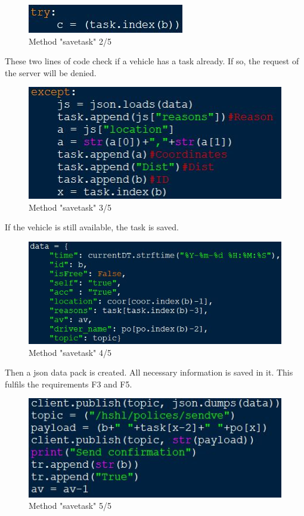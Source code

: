 \begin{figure}[!h]
\center
\includegraphics[scale=0.6]{images/Heiber/a9.JPG}
\caption[caption]{Method "savetask" 2/5}
\end{figure}
\newline
These two lines of code check if a vehicle has a task already. If so, the request of the server will be denied.
\begin{figure}[!h]
\center
\includegraphics[scale=0.6]{images/Heiber/a10.JPG}
\caption[caption]{Method "savetask" 3/5}
\end{figure}
\newline
If the vehicle is still available, the task is saved.
\begin{figure}[!h]
\center
\includegraphics[scale=0.6]{images/Heiber/a11.JPG}
\caption[caption]{Method "savetask" 4/5}
\end{figure}
\newline
Then a json data pack is created. All necessary information is saved in it. This fulfils the requirements F3 and F5.
\newpage
\begin{figure}[!h]
\center
\includegraphics[scale=0.6]{images/Heiber/a12.JPG}
\caption[caption]{Method "savetask" 5/5}
\end{figure}
